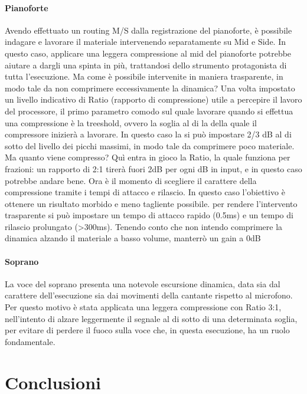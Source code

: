 		\paragraph{Pianoforte} Avendo effettuato un routing M/S dalla registrazione del pianoforte, è possibile indagare e lavorare il materiale intervenendo separatamente su Mid e Side. In questo caso, applicare una leggera compressione al mid del pianoforte potrebbe aiutare a dargli una spinta in più, trattandosi dello strumento protagonista di tutta l'esecuzione. Ma come è possibile intervenite in maniera trasparente, in modo tale da non comprimere eccessivamente la dinamica? Una volta impostato un livello indicativo di Ratio (rapporto di compressione) utile a percepire il lavoro del processore, il primo parametro comodo sul quale lavorare quando si effettua una compressione è la treeshold, ovvero la soglia al di la della quale il compressore inizierà a lavorare. In questo caso la si può impostare 2/3 dB al di sotto del livello dei picchi massimi, in modo tale da comprimere poco materiale. Ma quanto viene compresso? Quì entra in gioco la Ratio, la quale funziona per frazioni: un rapporto di 2:1 tirerà fuori 2dB per ogni dB in input, e in questo caso potrebbe andare bene.
		Ora è il momento di scegliere il carattere della compressione tramite i tempi di attacco e rilascio. In questo caso l'obiettivo è ottenere un risultato morbido e meno tagliente possibile. per rendere l'intervento trasparente si può impostare un tempo di attacco rapido (0.5ms) e un tempo di rilascio prolungato (>300ms).
		Tenendo conto che non intendo comprimere la dinamica alzando il materiale a basso volume, manterrò un gain a 0dB
		
		\paragraph{Soprano} La voce del soprano presenta una notevole escursione dinamica, data sia dal carattere dell'esecuzione sia dai movimenti della cantante rispetto al microfono. Per questo motivo è stata applicata una leggera compressione con Ratio 3:1, nell'intento di alzare leggermente il segnale al di sotto di una determinata soglia, per evitare di perdere il fuoco sulla voce che, in questa esecuzione, ha un ruolo fondamentale.
	
\section{Conclusioni}

